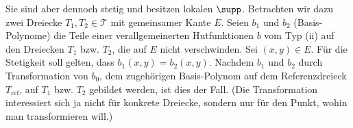 \begin{solution}
\begin{enumerate}[label = \textbf{\alph*)}]
  Sie sind aber dennoch stetig und besitzen lokalen $\supp$.
  Betrachten wir dazu zwei Dreiecke $T_1, T_2 \in \mathcal{T}$ mit gemeinsamer Kante $E$.
  Seien $b_1$ und $b_2$ (Basis-Polynome) die Teile einer verallgemeinerten Hutfunktionen $b$ vom Typ (ii) auf den Dreiecken $T_1$ bzw. $T_2$, die auf $E$ nicht verschwinden.
  Sei $(x, y) \in E$.
  Für die Stetigkeit soll gelten, dass $b_1(x, y) = b_2(x, y)$.
  Nachdem $b_1$ und $b_2$ durch Transformation von $b_0$, dem zugehörigen Basis-Polynom auf dem Referenzdreieck $T_\mathrm{ref}$, auf $T_1$ bzw. $T_2$ gebildet werden, ist dies der Fall.
  (Die Transformation interessiert sich ja nicht für konkrete Dreiecke, sondern nur für den Punkt, wohin man transformieren will.)

\end{enumerate}

\end{solution}

